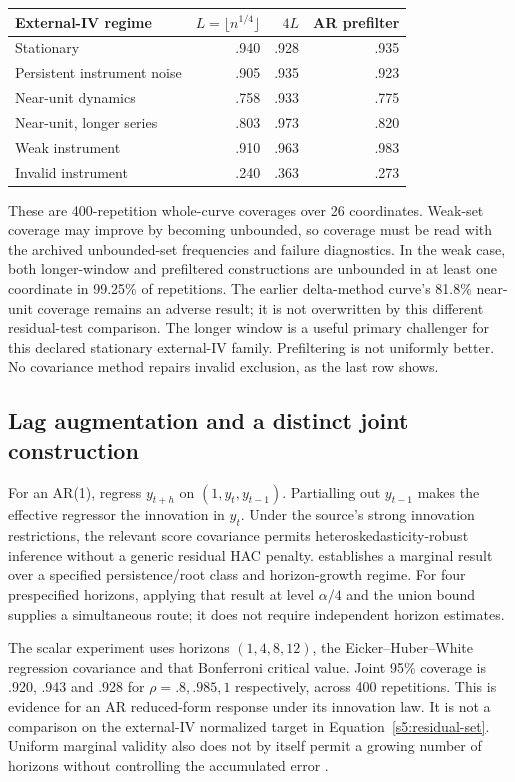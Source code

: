 \begin{center}\small
\begin{tabular}{lrrr}\toprule
External-IV regime & $L=\lfloor n^{1/4}\rfloor$ & $4L$ & AR prefilter\\\midrule
Stationary & .940 & .928 & .935\\
Persistent instrument noise & .905 & .935 & .923\\
Near-unit dynamics & .758 & .933 & .775\\
Near-unit, longer series & .803 & .973 & .820\\
Weak instrument & .910 & .963 & .983\\
Invalid instrument & .240 & .363 & .273\\\bottomrule
\end{tabular}\end{center}
These are 400-repetition whole-curve coverages over 26 coordinates. Weak-set
coverage may improve by becoming unbounded, so coverage must be read with
the archived unbounded-set frequencies and failure diagnostics. In the weak
case, both longer-window and prefiltered constructions are unbounded in at
least one coordinate in 99.25\% of repetitions. The earlier
delta-method curve's 81.8\% near-unit coverage remains an adverse result;
it is not overwritten by this different residual-test comparison. The
longer window is a useful primary challenger for this declared stationary
external-IV family. Prefiltering is not uniformly better. No covariance
method repairs invalid exclusion, as the last row shows.

\subsection{Lag augmentation and a distinct joint construction}
For an AR(1), regress $y_{t+h}$ on $(1,y_t,y_{t-1})$. Partialling out
$y_{t-1}$ makes the effective regressor the innovation in $y_t$. Under the
source's strong innovation restrictions, the relevant score covariance
permits heteroskedasticity-robust inference without a generic residual HAC
penalty. \citet[Definition 1, Assumptions 2--3 and Proposition 1]{lpaug2020}
establishes a marginal result over a specified persistence/root class and
horizon-growth regime. For four prespecified horizons, applying that result
at level $\alpha/4$ and the union bound supplies a simultaneous route;
it does not require independent horizon estimates.

The scalar experiment uses horizons $(1,4,8,12)$, the Eicker--Huber--White
regression covariance and that Bonferroni critical value. Joint 95\%
coverage is .920, .943 and .928 for $\rho=.8,.985,1$ respectively, across
400 repetitions. This is evidence for an AR reduced-form response under
its innovation law. It is not a comparison on the external-IV normalized
target in Equation~\eqref{s5:residual-set}. Uniform marginal validity also
does not by itself permit a growing number of horizons without controlling
the accumulated error \citep{inoue2023}.

